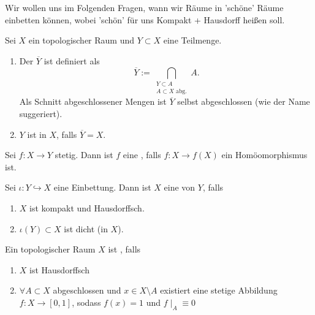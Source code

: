 \begin{goal*}
    Wir wollen uns im Folgenden Fragen, wann wir Räume in 'schöne' Räume einbetten können, wobei 'schön' für uns Kompakt + Hausdorff heißen soll.
\end{goal*}

\begin{definition} \label{def:abschluss-dichtheit}
    Sei $X$ ein topologischer Raum und $Y\subset X$ eine Teilmenge.
    \begin{enumerate}[1)]
        \item Der  $\overline{Y}$ ist definiert als
            \[
            \overline{Y} := \bigcap_{\substack{Y\subset A \\ A\subset X \text{ abg.}} } A
            .\] 
            Als Schnitt abgeschlossener Mengen ist $\overline{Y}$ selbst abgeschlossen (wie der Name suggeriert).
        \item  $Y$ ist  in $X$, falls  $\overline{Y} = X$.
    \end{enumerate}
\end{definition}
\begin{definition}[Einbettung]\label{def:einbettung}
    Sei $f:X\to Y$ stetig. Dann ist $f$ eine  , falls $f: X \to  f(X)$ ein Homöomorphismus ist.
\end{definition}
\begin{definition}[Kompaktifizierung] \label{def:kompaktifizierung}
    Sei $ι: Y\hookrightarrow X$ eine Einbettung. Dann ist $X$ eine  von $Y$, falls
    \begin{enumerate}[1)]
        \item $X$ ist kompakt und Hausdorffsch.
        \item  $ι(Y)\subset X$ ist dicht (in $X$).
    \end{enumerate}
\end{definition}
\begin{definition}\label{def:vollständig-regulär}
    Ein topologischer Raum $X$ ist  , falls
    \begin{enumerate}[1)]
        \item $X$ ist Hausdorffsch
        \item  $\forall A\subset X$ abgeschlossen und $x\in X\setminus A$ existiert eine stetige Abbildung $f:X \to  [0,1]$, sodass $f(x) = 1$ und  $f\mid _A \equiv 0$
    \end{enumerate}
\end{definition}
